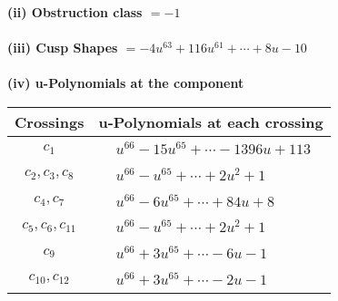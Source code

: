 \documentclass[1p]{elsarticle_modified}
\theoremstyle{definition}
\begin{document}
\flushleft \textbf{(ii) Obstruction class $= -1$}\\~\\
\flushleft \textbf{(iii) Cusp Shapes $= -4 u^{63}+116 u^{61}+\cdots+8 u-10$}\\~\\
\newpage\renewcommand{\arraystretch}{1}
\flushleft \textbf{(iv) u-Polynomials at the component}\newline \\
\begin{tabular}{m{50pt}|m{274pt}}
Crossings & \hspace{64pt}u-Polynomials at each crossing \\
\hline $$\begin{aligned}c_{1}\end{aligned}$$&$\begin{aligned}
&u^{66}-15 u^{65}+\cdots-1396 u+113
\end{aligned}$\\
\hline $$\begin{aligned}c_{2},c_{3},c_{8}\end{aligned}$$&$\begin{aligned}
&u^{66}- u^{65}+\cdots+2 u^2+1
\end{aligned}$\\
\hline $$\begin{aligned}c_{4},c_{7}\end{aligned}$$&$\begin{aligned}
&u^{66}-6 u^{65}+\cdots+84 u+8
\end{aligned}$\\
\hline $$\begin{aligned}c_{5},c_{6},c_{11}\end{aligned}$$&$\begin{aligned}
&u^{66}- u^{65}+\cdots+2 u^2+1
\end{aligned}$\\
\hline $$\begin{aligned}c_{9}\end{aligned}$$&$\begin{aligned}
&u^{66}+3 u^{65}+\cdots-6 u-1
\end{aligned}$\\
\hline $$\begin{aligned}c_{10},c_{12}\end{aligned}$$&$\begin{aligned}
&u^{66}+3 u^{65}+\cdots-2 u-1
\end{aligned}$\\
\hline
\end{tabular}\\~\\
\end{document}
